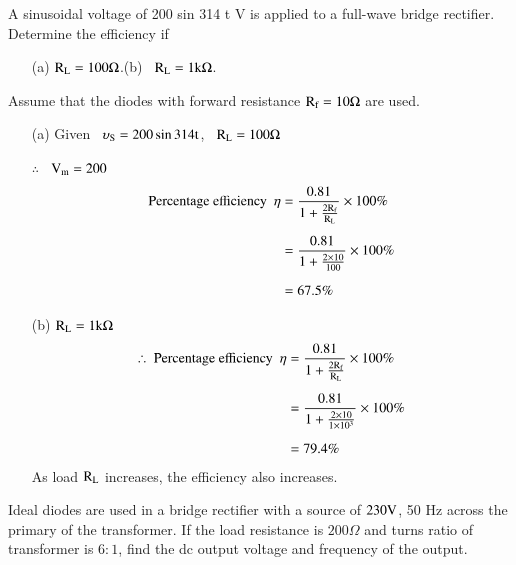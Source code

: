 \begin{problem}\label{prob1.15}
A sinusoidal voltage of 200 sin 314 t V is applied to a full-wave bridge rectifier. Determine the efficiency if
\begin{itemize}
\item[(a)] $\textrm{R}_{\textrm{L}}=100\Omega$.\qquad (b)~ $\textrm{R}_{\textrm{L}}=1\textrm{k}\Omega$.
\end{itemize}
Assume that the diodes with forward resistance $\textrm{R}_{\textrm{f}}=10\Omega$ are used.
\end{problem}

\begin{solution}
\begin{itemize}
\item[(a)] Given \ $\upsilon_{\textrm{S}} = 200\sin 314 \textrm{t}$, \ $\textrm{R}_{\textrm{L}}=100\Omega$

\hspace{2.1cm} $\therefore$~ $\textrm{V}_{\textrm{m}}=200$
\begin{align*}
\text{Percentage efficiency ~} \eta &= \frac{0.81}{1+\frac{2\textrm{R}_{\textrm{f}}}{\textrm{R}_{\textrm{L}}}}\times 100\%\\[5pt]
 &= \frac{0.81}{1+\frac{2\times 10}{100}}\times 100\%\\[5pt]
&= 67.5\%
\end{align*}

\item[(b)] $\textrm{R}_{\textrm{L}}=1\textrm{k}\Omega$
\begin{align*}
\therefore \ \text{Percentage efficiency~ } \eta &= \dfrac{0.81}{1+\frac{2\textrm{R}_{\textrm{f}}}{\textrm{R}_{\textrm{L}}}}\times 100\%\\[5pt]
&= \frac{0.81}{1+\frac{2\times 10}{1\times 10^{3}}}\times 100\%\\[5pt]
&= 79.4\%
\end{align*}
As load $\textrm{R}_{\textrm{L}}$ increases, the efficiency also increases.
\end{itemize}
\end{solution}

\begin{problem}\label{prob1.16}
Ideal diodes are used in a bridge rectifier with a source of $230\textrm{V}$, 50 Hz across the primary of the transformer. If the load resistance is $200\Omega$ and turns ratio of transformer is $6:1$, find the dc output voltage and frequency of the output.
\end{problem}

